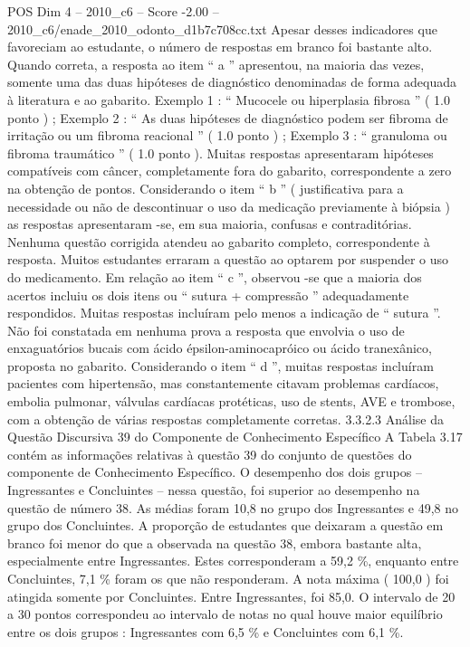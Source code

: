 \begin{textsample}{POS Dim 4 – 2010\_c6 – Score -2.00 – 2010\_c6/enade\_2010\_odonto\_d1b7c708cc.txt}
Apesar desses indicadores que favoreciam ao estudante, o número de respostas em branco foi bastante alto.
Quando correta, a resposta ao item “ a ” apresentou, na maioria das vezes, somente uma das duas hipóteses de diagnóstico denominadas de forma adequada à literatura e ao gabarito.
Exemplo 1 : “ Mucocele ou hiperplasia fibrosa ” ( 1.0 ponto ) ; Exemplo 2 : “ As duas hipóteses de diagnóstico podem ser fibroma de irritação ou um fibroma reacional ” ( 1.0 ponto ) ; Exemplo 3 : “ granuloma ou fibroma traumático ” ( 1.0 ponto ).
Muitas respostas apresentaram hipóteses compatíveis com câncer, completamente fora do gabarito, correspondente a zero na obtenção de pontos.
Considerando o item “ b ” ( justificativa para a necessidade ou não de descontinuar o uso da medicação previamente à biópsia ) as respostas apresentaram -se, em sua maioria, confusas e contraditórias.
Nenhuma questão corrigida atendeu ao gabarito completo, correspondente à resposta.
Muitos estudantes erraram a questão ao optarem por suspender o uso do medicamento.
Em relação ao item “ c ”, observou -se que a maioria dos acertos incluiu os dois itens ou “ sutura + compressão ” adequadamente respondidos.
Muitas respostas incluíram pelo menos a indicação de “ sutura ”.
Não foi constatada em nenhuma prova a resposta que envolvia o uso de enxaguatórios bucais com ácido épsilon-aminocapróico ou ácido tranexânico, proposta no gabarito.
Considerando o item “ d ”, muitas respostas incluíram pacientes com hipertensão, mas constantemente citavam problemas cardíacos, embolia pulmonar, válvulas cardíacas protéticas, uso de stents, AVE e trombose, com a obtenção de várias respostas completamente corretas. 3.3.2.3 Análise da Questão Discursiva 39 do Componente de Conhecimento Específico A Tabela 3.17 contém as informações relativas à questão 39 do conjunto de questões do componente de Conhecimento Específico.
O desempenho dos dois grupos – Ingressantes e Concluintes – nessa questão, foi superior ao desempenho na questão de número 38.
As médias foram 10,8 no grupo dos Ingressantes e 49,8 no grupo dos Concluintes.
A proporção de estudantes que deixaram a questão em branco foi menor do que a observada na questão 38, embora bastante alta, especialmente entre Ingressantes.
Estes corresponderam a 59,2 \%, enquanto entre Concluintes, 7,1 \% foram os que não responderam.
A nota máxima ( 100,0 ) foi atingida somente por Concluintes.
Entre Ingressantes, foi 85,0.
O intervalo de 20 a 30 pontos correspondeu ao intervalo de notas no qual houve maior equilíbrio entre os dois grupos : Ingressantes com 6,5 \% e Concluintes com 6,1 \%.

\end{textsample}
